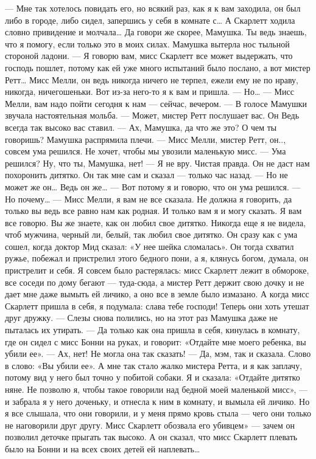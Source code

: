 — Мне так хотелось повидать его, но всякий раз, как я к вам заходила, он был либо в городе, либо сидел, запершись у себя в комнате с… А Скарлетт ходила словно привидение и молчала… Да говори же скорее, Мамушка. Ты ведь знаешь, что я помогу, если только это в моих силах.
Мамушка вытерла нос тыльной стороной ладони.
— Я говорю вам, мисс Скарлетт все может выдержать, что господь пошлет, потому как ей уже много испытаний было послано, а вот мистер Ретт… Мисс Мелли, он ведь никогда ничего не терпел, ежели ему не по нраву, никогда, ничегошеньки. Вот из-за него-то я к вам и пришла.
— Но…
— Мисс Мелли, вам надо пойти сегодня к нам — сейчас, вечером. — В голосе Мамушки звучала настоятельная мольба. — Может, мистер Ретт послушает вас. Он Ведь всегда так высоко вас ставил.
— Ах, Мамушка, да что же это? О чем ты говоришь? Мамушка распрямила плечи.
— Мисс Мелли, мистер Ретт, он.., совсем ума решился. Не хочет, чтобы мы увозили маленькую мисс.
— Ума решился? Ну, что ты, Мамушка, нет!
— Я не вру. Чистая правда. Он не даст нам похоронить дитятко. Он так мне сам и сказал — только час назад.
— Но не может же он… Ведь он же…
— Вот потому я и говорю, что он ума решился.
— Но почему…
— Мисс Мелли, я вам не все сказала. Не должна я говорить, да только вы ведь все равно нам как родная. И только вам я и могу сказать. Я вам все говорю. Вы же знаете, как он любил свое дитятко. Никогда еще я не видела, чтоб мужчина, черный ли, белый, так любил свое дитятко. Он сразу как с ума сошел, когда доктор Мид сказал: «У нее шейка сломалась». Он тогда схватил ружье, побежал и пристрелил этого бедного пони, а я, клянусь богом, думала, он пристрелит и себя. Я совсем было растерялась: мисс Скарлетт лежит в обмороке, все соседи по дому бегают — туда-сюда, а мистер Ретт держит свою дочку и не дает мне даже вымыть ей личико, а оно все в земле было измазано. А когда мисс Скарлетт пришла в себя, я подумала: слава тебе господи! Теперь они хоть утешат друг дружку. — Слезы снова полились, но на этот раз Мамушка даже не пыталась их утирать. — Да только как она пришла в себя, кинулась в комнату, где он сидел с мисс Бонни на руках, и говорит: «Отдайте мне моего ребенка, вы убили ее».
— Ах, нет! Не могла она так сказать!
— Да, мэм, так и сказала. Слово в слово: «Вы убили ее». А мне так стало жалко мистера Ретта, и я как заплачу, потому вид у него был точно у побитой собаки. Я и сказала: «Отдайте дитятко няне. Не позволю я, чтобы такое говорили над бедной моей маленькой мисс», — и забрала я у него доченьку, и отнесла к ним в комнату, и вымыла ей личико. Но я все слышала, что они говорили, и у меня прямо кровь стыла — чего они только не наговорили друг другу. Мисс Скарлетт обозвала его убивцем» — зачем он позволил деточке прыгать так высоко. А он сказал, что мисс Скарлетт плевать было на Бонни и на всех своих детей ей наплевать…
